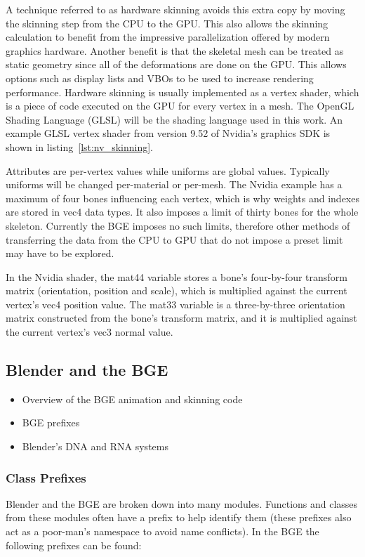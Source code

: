 A technique referred to as hardware skinning avoids this extra copy by moving the skinning step from the CPU to the GPU. This also allows the skinning calculation to benefit from the impressive parallelization offered by modern graphics hardware. Another benefit is that the skeletal mesh can be treated as static geometry since all of the deformations are done on the GPU. This allows options such as display lists and VBOs to be used to increase rendering performance. Hardware skinning is usually implemented as a vertex shader, which is a piece of code executed on the GPU for every vertex in a mesh. The OpenGL Shading Language (GLSL) will be the shading language used in this work. An example GLSL vertex shader from version 9.52 of Nvidia's graphics SDK\cite{nvidiasdk} is shown in listing~\ref{lst:nv_skinning}.


Attributes are per-vertex values while uniforms are global values. Typically uniforms will be changed per-material or per-mesh. The Nvidia example has a maximum of four bones influencing each vertex, which is why weights and indexes are stored in vec4 data types. It also imposes a limit of thirty bones for the whole skeleton. Currently the BGE imposes no such limits, therefore other methods of transferring the data from the CPU to GPU that do not impose a preset limit may have to be explored.

In the Nvidia shader, the mat44 variable stores a bone's four-by-four transform matrix (orientation, position and scale), which is multiplied against the current vertex's vec4 position value. The mat33 variable is a three-by-three orientation matrix constructed from the bone's transform matrix, and it is multiplied against the current vertex's vec3 normal value.

\subsection{Blender and the BGE}
\begin{itemize}
 \item Overview of the BGE animation and skinning code
 \item BGE prefixes
 \item Blender's DNA and RNA systems
\end{itemize}

\subsubsection{Class Prefixes}
Blender and the BGE are broken down into many modules. Functions and classes from these modules often have a prefix to help identify them (these prefixes also act as a poor-man's namespace to avoid name conflicts). In the BGE the following prefixes can be found:

